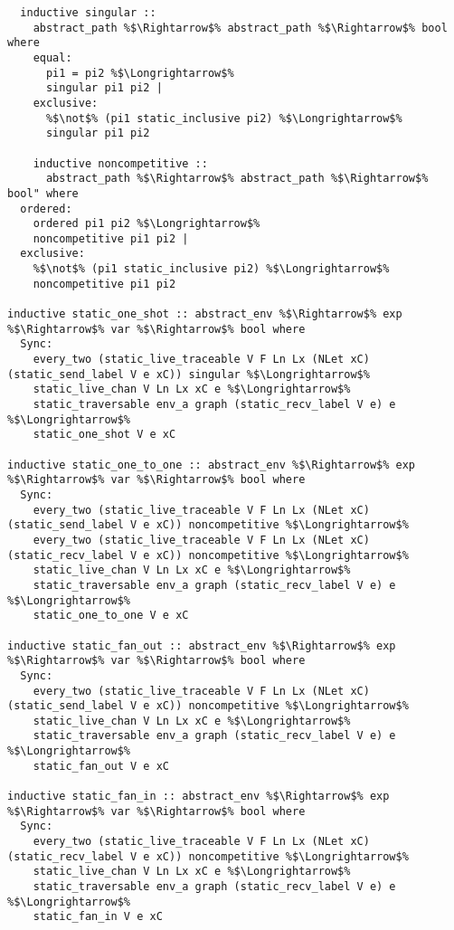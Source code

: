 \begin{lstlisting}[style=codestyle1, escapechar=\%]


  
  inductive singular ::
    abstract_path %$\Rightarrow$% abstract_path %$\Rightarrow$% bool where
    equal:
      pi1 = pi2 %$\Longrightarrow$% 
      singular pi1 pi2 |
    exclusive:
      %$\not$% (pi1 static_inclusive pi2) %$\Longrightarrow$% 
      singular pi1 pi2

    inductive noncompetitive ::
      abstract_path %$\Rightarrow$% abstract_path %$\Rightarrow$% bool" where
  ordered:
    ordered pi1 pi2 %$\Longrightarrow$% 
    noncompetitive pi1 pi2 |
  exclusive:
    %$\not$% (pi1 static_inclusive pi2) %$\Longrightarrow$% 
    noncompetitive pi1 pi2

inductive static_one_shot :: abstract_env %$\Rightarrow$% exp %$\Rightarrow$% var %$\Rightarrow$% bool where
  Sync:
    every_two (static_live_traceable V F Ln Lx (NLet xC) (static_send_label V e xC)) singular %$\Longrightarrow$%
    static_live_chan V Ln Lx xC e %$\Longrightarrow$%
    static_traversable env_a graph (static_recv_label V e) e %$\Longrightarrow$%
    static_one_shot V e xC

inductive static_one_to_one :: abstract_env %$\Rightarrow$% exp %$\Rightarrow$% var %$\Rightarrow$% bool where
  Sync:
    every_two (static_live_traceable V F Ln Lx (NLet xC) (static_send_label V e xC)) noncompetitive %$\Longrightarrow$%
    every_two (static_live_traceable V F Ln Lx (NLet xC) (static_recv_label V e xC)) noncompetitive %$\Longrightarrow$%
    static_live_chan V Ln Lx xC e %$\Longrightarrow$%
    static_traversable env_a graph (static_recv_label V e) e %$\Longrightarrow$%
    static_one_to_one V e xC

inductive static_fan_out :: abstract_env %$\Rightarrow$% exp %$\Rightarrow$% var %$\Rightarrow$% bool where
  Sync:
    every_two (static_live_traceable V F Ln Lx (NLet xC) (static_send_label V e xC)) noncompetitive %$\Longrightarrow$%
    static_live_chan V Ln Lx xC e %$\Longrightarrow$%
    static_traversable env_a graph (static_recv_label V e) e %$\Longrightarrow$%
    static_fan_out V e xC

inductive static_fan_in :: abstract_env %$\Rightarrow$% exp %$\Rightarrow$% var %$\Rightarrow$% bool where
  Sync:
    every_two (static_live_traceable V F Ln Lx (NLet xC) (static_recv_label V e xC)) noncompetitive %$\Longrightarrow$%
    static_live_chan V Ln Lx xC e %$\Longrightarrow$%
    static_traversable env_a graph (static_recv_label V e) e %$\Longrightarrow$%
    static_fan_in V e xC

  \end{lstlisting}
    
